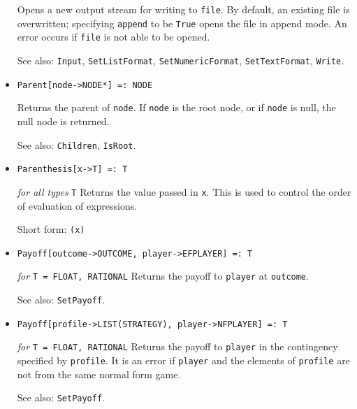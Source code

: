 \begin{itemize}
\bd
Opens a new output stream for writing to \verb+file+.  By default,
an existing file is overwritten; specifying \verb+append+ to be \verb+True+
opens the file in append mode.  An error occurs if \verb+file+ is not
able to be opened.
\item [See also:] \verb+Input+, \verb+SetListFormat+, \verb+SetNumericFormat+,
\verb+SetTextFormat+, \verb+Write+.
\ed


\item
\protect \large \begin{verbatim}
Parent[node->NODE*] =: NODE
\end{verbatim}\normalsize

\bd
Returns the parent of \verb+node+.  If \verb+node+ is the root node,
or if \verb+node+ is null, the null node is returned.
\item [See also:] \verb+Children+, \verb+IsRoot+.
\ed

\item
\protect \large \begin{verbatim}
Parenthesis[x->T] =: T
\end{verbatim}\normalsize

{\it for all types} {\tt T}
\bd
Returns the value passed in \verb+x+.  This is used to control
the order of evaluation of expressions.
\item [Short form:] \verb+(x)+
\ed

\item
\protect \large \begin{verbatim}
Payoff[outcome->OUTCOME, player->EFPLAYER] =: T
\end{verbatim}\normalsize

{\it for} {\tt T = FLOAT, RATIONAL}
\bd
Returns the payoff to \verb+player+ at \verb+outcome+.
\item [See also:] \verb+SetPayoff+.
\ed

\item
\protect \large \begin{verbatim}
Payoff[profile->LIST(STRATEGY), player->NFPLAYER] =: T
\end{verbatim}\normalsize

{\it for} {\tt T = FLOAT, RATIONAL}
\bd
Returns the payoff to \verb+player+ in the contingency specified by
\verb+profile+.  It is an error if \verb+player+ and the elements of
\verb+profile+ are not from the same normal form game.
\item [See also:] \verb+SetPayoff+.
\ed


\end{itemize}
